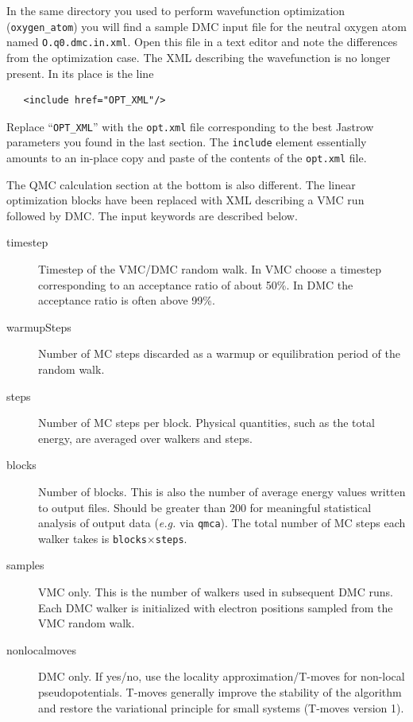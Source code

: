 In the same directory you used to perform wavefunction optimization (\texttt{oxygen\_atom}) you will find a sample DMC input file for the neutral oxygen atom named \texttt{O.q0.dmc.in.xml}.  Open this file in a text editor and note the differences from the optimization case.  The XML describing the wavefunction is no longer present.  In its place is the line
\begin{shaded}
\begin{verbatim}
   <include href="OPT_XML"/>
\end{verbatim}
\end{shaded}
\noindent
Replace ``\texttt{OPT\_XML}'' with the \texttt{opt.xml} file corresponding to the best Jastrow parameters you found in the last section.  The \texttt{include} element essentially amounts to an in-place copy and paste of the contents of the \texttt{opt.xml} file.

The QMC calculation section at the bottom is also different.  The linear optimization blocks have been replaced with XML describing a VMC run followed by DMC.  The input keywords are described below.

\begin{description}
  \item[timestep] Timestep of the VMC/DMC random walk.  In VMC choose a timestep corresponding to an acceptance ratio of about 50\%.  In DMC the acceptance ratio is often above 99\%.
  \item[warmupSteps]  Number of MC steps discarded as a warmup or equilibration period of the random walk.  
  \item[steps] Number of MC steps per block.  Physical quantities, such as the total energy, are averaged over walkers and steps.
  \item[blocks]  Number of blocks.  This is also the number of average energy values written to output files.  Should be greater than 200 for meaningful statistical analysis of output data (\emph{e.g.} via \texttt{qmca}).  The total number of MC steps each walker takes is \texttt{blocks}$\times$\texttt{steps}.
  \item[samples] VMC only. This is the number of walkers used in subsequent DMC runs.  Each DMC walker is initialized with electron positions sampled from the VMC random walk.
  \item[nonlocalmoves] DMC only.  If yes/no, use the locality approximation/T-moves for non-local pseudopotentials.  T-moves generally improve the stability of the algorithm and restore the variational principle for small systems (T-moves version 1).
\end{description}

